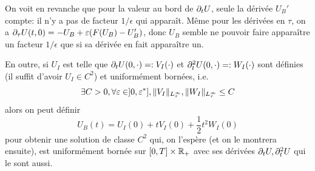 On voit en revanche que pour la valeur au bord de $\partial_t U$, seule la dérivée $U_B'$ compte: il n'y a pas de facteur $1/\epsilon$ qui apparaît. Même pour les dérivées en $\tau$, on a $\partial_{\tau} U(t,0) = -U_B + \varepsilon(F(U_B) - U_B')$, donc $U_B$ semble ne pouvoir faire apparaître un facteur $1/\epsilon$ que si sa dérivée en fait apparaître un. 

En outre, si $U_I$ est telle que $\partial_t U(0,\cdot) =: V_I(\cdot)$ et $\partial_t^2 U(0,\cdot) =: W_I(\cdot)$ sont définies (il suffit d'avoir $U_I \in C^2$) et uniformément bornées, i.e. $$\exists C>0,\forall \varepsilon\in]0,\varepsilon^*], \|V_I\|_{L^{\infty}_{\tau}},\|W_I\|_{L^{\infty}_{\tau}} \leq C$$
alors on peut définir 
\begin{equation} \label{eq:CB_UVW}
U_B(t) = U_I(0) + t V_I(0) + \frac 1 2 t^2 W_I(0)
\end{equation}
pour obtenir une solution de classe $C^2$ qui, on l'espère (et on le montrera ensuite), est uniformément bornée sur $[0,T]\times\mathbb{R}_+$ avec ses dérivées $\partial_t U, \partial_t^2 U$ qui le sont aussi. 